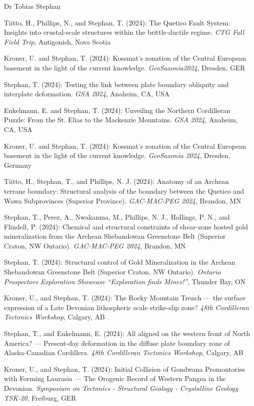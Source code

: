 \documentclass[10pt, paper=letter]{scrartcl} %
\begin{document}
\begin{cv}{\textcolor{myred}{\textsf{Dr Tobias Stephan}}}
\begin{cvlist}{}
        \item[39] Tiitto, H., Phillips, N., and Stephan, T. (2024): The Quetico Fault System: Insights into crustal-scale structures within the brittle-ductile regime. \textit{CTG Fall Field Trip}, Antigonish, Nova Scotia
        \item[38] Kroner, U. and Stephan, T. (2024): Kossmat's zonation of the Central European basement in the light of the current knowledge. \textit{GeoSaxonia2024}, Dresden, GER
        \item[37] Stephan, T. (2024): Testing the link between plate boundary obliquity and interplate deformation. \textit{GSA 2024}, Anaheim, CA, USA
        \item[36] Enkelmann, E. and Stephan, T. (2024): Unveiling the Northern Cordilleran Puzzle: From the St. Elias to the Mackenzie Mountains. \textit{GSA 2024}, Anaheim, CA, USA
        \item[35] Kroner, U. and Stephan, T. (2024): Kossmat's zonation of the Central European basement in the light of the current knowledge. \textit{GeoSaxonia 2024}, Dresden, Germany
        \item[34] Tiitto, H., Stephan, T., and Phillips, N. J. (2024): Anatomy of an Archean terrane boundary: Structural analysis of the boundary between the Quetico and Wawa Subprovinces (Superior Province). \textit{GAC-MAC-PEG 2024}, Brandon, MN
        \item[33] Stephan, T., Perez, A., Nwakanma, M., Phillips, N. J., Hollings, P. N., and Flindell, P. (2024): Chemical and structural constraints of shear-zone hosted gold mineralization from the Archean Shebandowan Greenstone Belt (Superior Craton, NW Ontario). \textit{GAC-MAC-PEG 2024}, Brandon, MN
        \item[32] Stephan, T. (2024): Structural control of Gold Mineralization in the Archean Shebandowan Greenstone Belt (Superior Craton, NW Ontario). \textit{Ontario Prospectors Exploration Showcase \enquote{Exploration finds Mines!}}, Thunder Bay, ON
        \item[31] Kroner, U., and Stephan, T. (2024): The Rocky Mountain Trench --- the surface expression of a Late Devonian lithospheric scale strike-slip zone? \textit{48th Cordilleran Tectonics Workshop}, Calgary, AB
        \item[30] Stephan, T., and Enkelmann, E. (2024): All aligned on the western front of North America? --- Present-day deformation in the diffuse plate boundary zone of Alaska-Canadian Cordillera. \textit{48th Cordilleran Tectonics Workshop}, Calgary, AB
        \item[29] Kroner, U., and Stephan, T. (2024): Initial Collision of Gondwana Promontories with Forming Laurasia --- The Orogenic Record of Western Pangea in the Devonian. \textit{Symposium on Tectonics - Structural Geology - Crystalline Geology TSK-20}, Freiburg, GER


\end{cvlist}
\end{cv}
\end{document}
